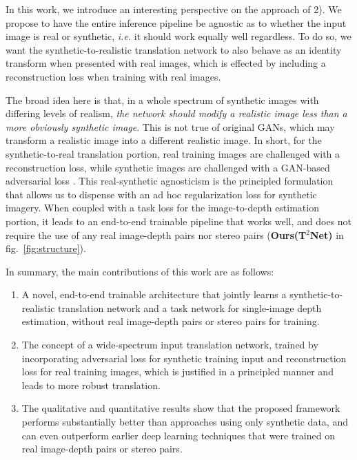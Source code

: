 \documentclass[runningheads]{llncs}
\def\ie{\emph{i.e.}\xspace}
\begin{document}
In this work, we introduce an interesting perspective on the approach of 2). We propose to have the entire inference pipeline be agnostic as to whether the input image is real or synthetic, \ie it should work equally well regardless. To do so, we want the synthetic-to-realistic translation network to also behave as an identity transform when presented with real images, which is effected by including a reconstruction loss when training with real images.

The broad idea here is that, in a whole spectrum of synthetic images with differing levels of realism, \emph{the network should modify a realistic image less than a more obviously synthetic image}. This is not true of original GANs, which may transform a realistic image into a different realistic image. In short, for the synthetic-to-real translation portion, real training images are challenged with a reconstruction loss, while synthetic images are challenged with a GAN-based adversarial loss \cite{goodfellow2014generative}. This real-synthetic agnosticism is the principled formulation that allows us to dispense with an ad hoc regularization loss for synthetic imagery. When coupled with a task loss for the image-to-depth estimation portion, it leads to an end-to-end trainable pipeline that works well, and does not require the use of any real image-depth pairs nor stereo pairs ({\bf Ours(T$^2$Net)} in fig.~\ref{fig:structure}).

In summary, the main contributions of this work are as follows:
\begin{enumerate}
	\item A novel, end-to-end trainable architecture that jointly learns a synthetic-to-realistic translation network and a task network for single-image depth estimation, without real image-depth pairs or stereo pairs for training. 
	
	\item The concept of a wide-spectrum input translation network, trained by incorporating adversarial loss for synthetic training input and reconstruction loss for real training images, which is justified in a principled manner and leads to more robust translation.
	
	\item The qualitative and quantitative results show that the proposed framework performs substantially better than approaches using only synthetic data, and can even outperform earlier deep learning techniques that were trained on real image-depth pairs or stereo pairs.
\end{enumerate}
\end{document}
